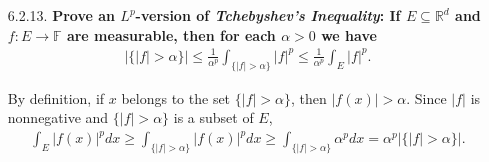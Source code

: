\documentclass[a4paper,12pt]{article}
\begin{document}
\begin{enumerate}
    \item[6.2.13.]
        \boldmath\textbf{Prove an $L^p$-version of \emph{Tchebyshev's Inequality}: If $E \subseteq \mathbb{R}^d$ and $f : E \to \mathbb{F}$ are measurable, then for each $\alpha > 0$ we have
        \begin{align*}
            |\{|f| > \alpha\}| \leq \frac{1}{\alpha^p} \int_{\{|f| > \alpha\}} |f|^p \leq \frac{1}{\alpha^p} \int_E |f|^p.
        \end{align*}
        }\unboldmath \par
        By definition, if $x$ belongs to the set $\{ |f| > \alpha \}$, then $|f(x)| > \alpha$. Since $|f|$ is nonnegative and $\{ |f| > \alpha \}$ is a subset of $E$,
        \begin{align*}
            \int_E |f(x)|^p dx \geq \int_{\{|f| > \alpha\}} |f(x)|^p dx \geq \int_{\{|f| > \alpha\}} \alpha^p dx = \alpha^p |\{ |f| > \alpha \}|.
        \end{align*}


\end{enumerate}
\end{document}
